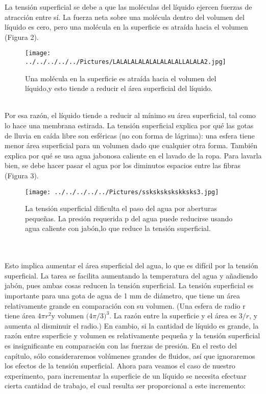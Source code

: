 \documentclass[10pt,a4paper]{article}
\begin{document}
La tensi\'{o}n superficial se debe a que las mol\'{e}culas del l\'{i}quido ejercen fuerzas de atracci\'{o}n entre s\'{i}. La fuerza neta sobre una mol\'{e}cula dentro del volumen del l\'{i}quido es cero, pero una mol\'{e}cula en la superficie es atra\'{i}da hacia el volumen (Figura 2).
\\
\begin{figure}[hbtp]
\centering
\texttt{[image: ../../../../../Pictures/LALALALALALALALALALLALALA2.jpg]}
\caption{Una mol\'{e}cula en la superficie es atra\'{i}da hacia el volumen del l\'{i}quido,y esto tiende a reducir el \'{a}rea superficial del l\'{i}quido.}
\end{figure}
\\
Por esa raz\'{o}n, el l\'{i}quido tiende a reducir al m\'{i}nimo su \'{a}rea superficial, tal como lo hace una membrana estirada. La tensi\'{o}n superficial explica por qu\'{e} las gotas de lluvia en ca\'{i}da libre son esf\'{e}ricas (no con forma de l\'{a}grima): una esfera tiene menor \'{a}rea superficial para un volumen dado que cualquier otra forma. Tambi\'{e}n explica por qu\'{e} se usa agua jabonosa caliente en el lavado de la ropa. Para lavarla bien, se debe hacer pasar el agua por los diminutos espacios entre las fibras (Figura 3).
\\
\begin{figure}[hbtp]
\centering
\texttt{[image: ../../../../../Pictures/sskskskskskksks3.jpg]}
\caption{La tensi\'{o}n superficial dificulta el paso del agua por aberturas peque\~{n}as. La presi\'{o}n requerida p del agua puede reducirse usando agua caliente con jab\'{o}n,lo que reduce la tensi\'{o}n superficial.}
\end{figure}
\\
\\
Esto implica aumentar el \'{a}rea superficial del agua, lo que es dif\'{i}cil por la tensi\'{o}n superficial. La tarea se facilita aumentando la temperatura del agua y a\~{n}adiendo jab\'{o}n, pues ambas cosas reducen la tensi\'{o}n superficial. La tensi\'{o}n superficial es importante para una gota de agua de 1 mm de di\'{a}metro, que tiene un \'{a}rea relativamente grande en comparaci\'{o}n con su volumen. (Una esfera de radio r tiene \'{a}rea $4\pi { r }^{ 2 }$y volumen ${ (4\pi  }/3)^{ 3 }$. La raz\'{o}n entre la superficie y el \'{a}rea es $3/r$, y aumenta al disminuir el radio.) En cambio, si la cantidad de l\'{i}quido es grande, la raz\'{o}n entre superficie y volumen es relativamente peque\~{n}a y la tensi\'{o}n superficial es insignificante en comparaci\'{o}n con las fuerzas de presi\'{o}n. En el resto del cap\'{i}tulo, s\'{o}lo consideraremos vol\'{u}menes grandes de fluidos, as\'{i} que ignoraremos los efectos de la tensi\'{o}n superficial. Ahora para veamos el caso de nuestro experimento, para incrementar la superficie de un l\'{i}quido se necesita efectuar cierta cantidad de trabajo, el cual resulta ser proporcional a este incremento:
\end{document}
